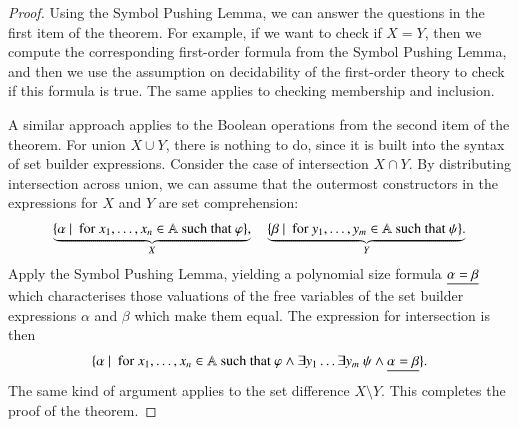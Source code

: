 \begin{proof}
Using the Symbol Pushing Lemma, we can answer the questions in the first item of the theorem. For example, if we want to check if $X = Y$, then we compute the corresponding first-order formula from the Symbol Pushing Lemma, and then we use the assumption on decidability of the first-order theory to  check if this formula is true. The same applies to checking membership and inclusion.

A similar approach applies to the Boolean operations from the second item of the theorem. For union $X \cup Y$,  there is nothing to do, since it is built into the syntax of set builder expressions.
Consider the case of intersection $X \cap Y$. By distributing intersection across union, we can assume that  the outermost constructors in the expressions for $X$ and $Y$ are set comprehension:
	\begin{align*}
		\underbrace{\{\alpha\ |\ \text{ for }x_1,\ldots,x_n \in \mathbb A \text{ such that }\varphi\},}_X \quad \underbrace{\{\beta\ |\ \text{ for }y_1,\ldots,y_m \in \mathbb A \text{ such that }\psi\}.}_Y
	\end{align*}
Apply the Symbol Pushing Lemma, yielding a polynomial size formula $\underline{\alpha = \beta}$ which characterises those valuations of the free variables of the set builder expressions $\alpha$ and $\beta$ which make them equal. The expression for intersection is then
\begin{align*}
	\{\alpha\ |\ \text{ for }x_1,\ldots,x_n \in \mathbb A \text{ such that }\varphi \land \exists y_1\ldots \exists y_m \ \psi \land \underline{\alpha = \beta} \}.
\end{align*}
The same kind of argument applies to the set difference $X \setminus Y$. 
This completes the proof of the theorem.
\end{proof}






